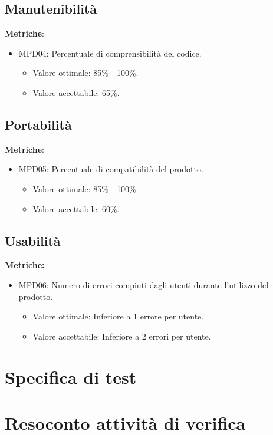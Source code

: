 \documentclass[12pt]{article}
\begin{document}
\subsection{Manutenibilità}
\textbf{Metriche}:
\begin{itemize}
	\item MPD04: Percentuale di comprensibilità del codice.
	      \begin{itemize}
		      \item Valore ottimale: 85\% - 100\%.
		      \item Valore accettabile: 65\%.
	      \end{itemize}
\end{itemize}

\subsection{Portabilità}
\textbf{Metriche}:
\begin{itemize}
	\item MPD05: Percentuale di compatibilità del prodotto.
	      \begin{itemize}
		      \item Valore ottimale: 85\% - 100\%.
		      \item Valore accettabile: 60\%.
	      \end{itemize}
\end{itemize}


\subsection{Usabilità}
\textbf{Metriche:}
\begin{itemize}
	\item MPD06: Numero di errori compiuti dagli utenti durante l'utilizzo del prodotto.
	      \begin{itemize}
		      \item Valore ottimale: Inferiore a 1 errore per utente.
		      \item Valore accettabile: Inferiore a 2 errori per utente.
	      \end{itemize}
\end{itemize}



\section{Specifica di test}
\section {Resoconto attività di verifica}
\end{document}

